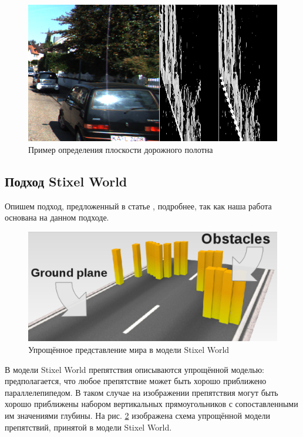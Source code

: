 \documentclass[aps,%
14pt,%
final,%
oneside,
onecolumn,%
musixtex, %
superscriptaddress,%
centertags]{extarticle} %
\begin{document}
\begin{figure}[htp]
\centering
\includegraphics[width=\textwidth]{vdisp_concat.png}
\caption{Пример определения плоскости дорожного полотна}
\label{fig:vdisp_example}
\end{figure}

\subsection{Подход Stixel World} \label{sec:stixels}

Опишем подход, предложенный в статье \cite{pfeiffer2010efficient}, подробнее, так как наша работа основана на данном подходе.

\begin{figure}[htp]
\centering
\includegraphics[width=\textwidth]{stixels_basic.png}
\caption{Упрощённое представление мира в модели Stixel World \cite{benenson2011stixels}}
\label{stixels_basic}
\end{figure}

В модели Stixel World препятствия описываются упрощённой моделью: предполагается, что любое препятствие может быть хорошо приближено параллелепипедом. В таком случае на изображении препятствия могут быть хорошо приближены набором вертикальных прямоугольников с сопоставленными им значениями глубины. На рис. \ref{stixels_basic} изображена схема упрощённой модели препятствий, принятой в модели Stixel World.
\end{document}
